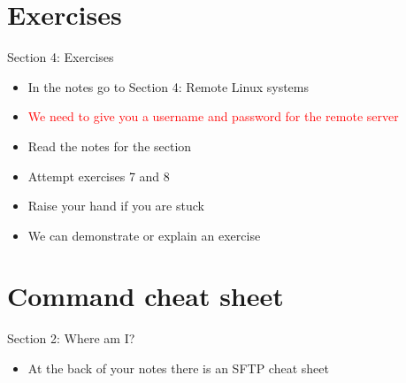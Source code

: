 \section{Exercises}
\begin{frame}{Section 4: Exercises}
\begin{itemize}
\item In the notes go to Section 4: Remote Linux systems
\item {\textcolor{red}{We need to give you a username and password for the remote server}}
\item Read the notes for the section 
\item Attempt exercises 7 and 8
\item Raise your hand if you are stuck
\item We can demonstrate or explain an exercise
\end{itemize}
\end{frame}

\section{Command cheat sheet}
\begin{frame}{Section 2: Where am I?}
\begin{itemize}
\item At the back of your notes there is an SFTP cheat sheet
\end{itemize}
\end{frame}